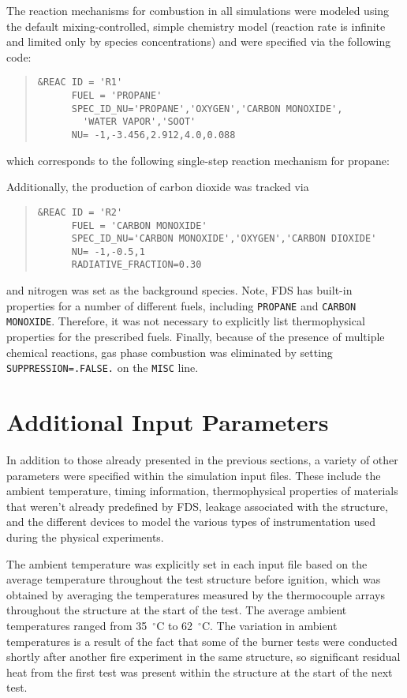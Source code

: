 The reaction mechanisms for combustion in all simulations were modeled using the default mixing-controlled, simple chemistry model (reaction rate is infinite and limited only by species concentrations) and were specified via the following code:
\begin{quote}
\begin{verbatim}
&REAC ID = 'R1'
      FUEL = 'PROPANE'
      SPEC_ID_NU='PROPANE','OXYGEN','CARBON MONOXIDE',
        'WATER VAPOR','SOOT'
      NU= -1,-3.456,2.912,4.0,0.088 
\end{verbatim}
\end{quote}
\noindent which corresponds to the following single-step reaction mechanism for propane:
\begin{center}
\end{center}
Additionally, the production of carbon dioxide was tracked via
\begin{quote}
\begin{verbatim}
&REAC ID = 'R2'
      FUEL = 'CARBON MONOXIDE'
      SPEC_ID_NU='CARBON MONOXIDE','OXYGEN','CARBON DIOXIDE'
      NU= -1,-0.5,1
      RADIATIVE_FRACTION=0.30   
\end{verbatim}
\end{quote}
and nitrogen was set as the background species. Note, FDS has built-in properties for a number of different fuels, including \verb|PROPANE| and \verb|CARBON MONOXIDE|. Therefore, it was not necessary to explicitly list thermophysical properties for the prescribed fuels. Finally, because of the presence of multiple chemical reactions, gas phase combustion was eliminated by setting \verb|SUPPRESSION=.FALSE.| on the \verb|MISC| line.
\FloatBarrier

\section{Additional Input Parameters}
In addition to those already presented in the previous sections, a variety of other parameters were specified within the simulation input files. These include the ambient temperature, timing information, thermophysical properties of materials that weren't already predefined by FDS, leakage associated with the structure, and the different devices to model the various types of instrumentation used during the physical experiments.

The ambient temperature was explicitly set in each input file based on the average temperature throughout the test structure before ignition, which was obtained by averaging the temperatures measured by the thermocouple arrays throughout the structure at the start of the test. The average ambient temperatures ranged from 35~$^\circ$C to 62~$^\circ$C. The variation in ambient temperatures is a result of the fact that some of the burner tests were conducted shortly after another fire experiment in the same structure, so significant residual heat from the first test was present within the structure at the start of the next test.

